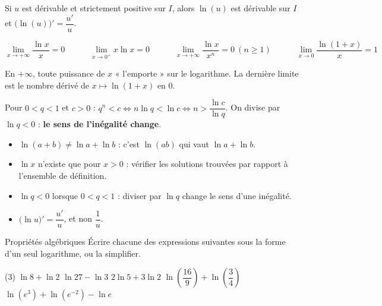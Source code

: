 \begin{theoreme}
Si $u$ est dérivable et strictement positive sur $I$, alors $\ln(u)$ est dérivable sur $I$ et
$\big(\ln(u)\big)'=\dfrac{u'}{u}$.
\end{theoreme}


\begin{theoreme}
\[
  \lim_{x\to+\infty}\frac{\ln x}{x}=0 \qquad\quad
  \lim_{x\to0^{+}}x\ln x=0 \qquad\quad
  \lim_{x\to+\infty}\frac{\ln x}{x^{n}}=0\ (n\geq1) \qquad\quad
  \lim_{x\to0}\frac{\ln(1+x)}{x}=1
\]
\end{theoreme}

En $+\infty$, toute puissance de $x$ « l'emporte » sur le logarithme. La dernière limite est le nombre dérivé de
$x\mapsto\ln(1+x)$ en $0$.

\begin{savoirfaire}
Pour $0<q<1$ et $c>0$ : $q^{n}<c\iff n\ln q<\ln c\iff n>\dfrac{\ln c}{\ln q}$.\enspace
On divise par $\ln q<0$ : \textbf{le sens de l'inégalité change}.
\end{savoirfaire}

\begin{attention}
\begin{itemize}[label={\color{otOrange}\textbullet},leftmargin=1.4em,itemsep=0.6mm,topsep=0.5mm]
  \item $\ln(a+b)\neq\ln a+\ln b$ : c'est $\ln(ab)$ qui vaut $\ln a+\ln b$.
  \item $\ln x$ n'existe que pour $x>0$ : vérifier les solutions trouvées par rapport à l'ensemble de définition.
  \item $\ln q<0$ lorsque $0<q<1$ : diviser par $\ln q$ change le sens d'une inégalité.
  \item $\big(\ln u\big)'=\dfrac{u'}{u}$, et non $\dfrac1u$.
\end{itemize}
\end{attention}

\exercices
{}

\begin{exercice}[1]{Propriétés algébriques}
Écrire chacune des expressions suivantes sous la forme d'un seul logarithme, ou la simplifier.
\begin{tasks}(3)
  \task $\ln8+\ln2$
  \task $\ln27-\ln3$
  \task $2\ln5+3\ln2$
  \task $\ln\left(\dfrac{16}{9}\right)+\ln\left(\dfrac34\right)$
  \task $\ln\left(e^{3}\right)+\ln\left(e^{-2}\right)-\ln e$
\end{tasks}
\end{exercice}

